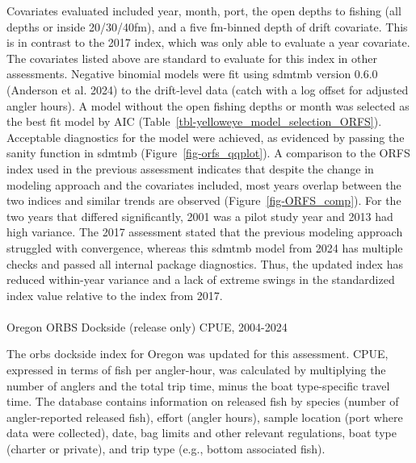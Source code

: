 \documentclass[
  english,
]{article}
\makeatletter
\let\oldparagraph\paragraph
\renewcommand{\paragraph}{
    \@ifstar
      \xxxParagraphStar
      \xxxParagraphNoStar
  }
\newcommand{\xxxParagraphStar}[1]{\oldparagraph*{#1}\mbox{}}
\newcommand{\xxxParagraphNoStar}[1]{\oldparagraph{#1}\mbox{}}
\makeatother
\begin{document}
Covariates evaluated included year, month, port, the open depths to
fishing (all depths or inside 20/30/40fm), and a five fm-binned depth of
drift covariate. This is in contrast to the 2017 index, which was only
able to evaluate a year covariate. The covariates listed above are
standard to evaluate for this index in other assessments. Negative
binomial models were fit using \gls{sdmtmb} version 0.6.0 (Anderson et
al. 2024) to the drift-level data (catch with a log offset for adjusted
angler hours). A model without the open fishing depths or month was
selected as the best fit model by AIC
(Table~\ref{tbl-yelloweye_model_selection_ORFS}). Acceptable diagnostics
for the model were achieved, as evidenced by passing the sanity function
in \gls{sdmtmb} (Figure~\ref{fig-orfs_qqplot}). A comparison to the ORFS
index used in the previous assessment indicates that despite the change
in modeling approach and the covariates included, most years overlap
between the two indices and similar trends are observed
(Figure~\ref{fig-ORFS_comp}). For the two years that differed
significantly, 2001 was a pilot study year and 2013 had high variance.
The 2017 assessment stated that the previous modeling approach struggled
with convergence, whereas this \gls{sdmtmb} model from 2024 has multiple
checks and passed all internal package diagnostics. Thus, the updated
index has reduced within-year variance and a lack of extreme swings in
the standardized index value relative to the index from 2017.

\paragraph{Oregon ORBS Dockside (release only) CPUE,
2004-2024}\label{oregon-orbs-dockside-release-only-cpue-2004-2024}

The \gls{orbs} dockside index for Oregon was updated for this
assessment. CPUE, expressed in terms of fish per angler-hour, was
calculated by multiplying the number of anglers and the total trip time,
minus the boat type-specific travel time. The database contains
information on released fish by species (number of angler-reported
released fish), effort (angler hours), sample location (port where data
were collected), date, bag limits and other relevant regulations, boat
type (charter or private), and trip type (e.g., bottom associated fish).
\end{document}
